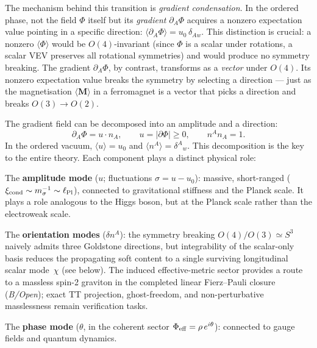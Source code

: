 \documentclass[11pt,a4paper]{article}
\begin{document}
The mechanism behind this transition is \emph{gradient condensation}. In the ordered phase, not the field $\Phi$ itself but its \emph{gradient} $\partial_A\Phi$ acquires a nonzero expectation value pointing in a specific direction: $\langle\partial_A\Phi\rangle = u_0\,\delta_{Aw}$. This distinction is crucial: a nonzero $\langle\Phi\rangle$ would be $O(4)$-invariant (since $\Phi$ is a scalar under rotations, a scalar VEV preserves all rotational symmetries) and would produce no symmetry breaking. The gradient $\partial_A\Phi$, by contrast, transforms as a \emph{vector} under $O(4)$. Its nonzero expectation value breaks the symmetry by selecting a direction --- just as the magnetisation $\langle\mathbf{M}\rangle$ in a ferromagnet is a vector that picks a direction and breaks $O(3) \to O(2)$.

The gradient field can be decomposed into an amplitude and a direction:
\begin{equation}
  \partial_A\Phi = u \cdot n_A,
  \qquad u = |\partial\Phi| \geq 0,
  \qquad n^A n_A = 1.
  \label{eq:pop_polar}
\end{equation}
In the ordered vacuum, $\langle u \rangle = u_0$ and $\langle n^A \rangle = \delta^A{}_w$. This decomposition is the key to the entire theory. Each component plays a distinct physical role:

The \textbf{amplitude mode} ($u$; fluctuations $\sigma = u - u_0$): massive, short-ranged ($\xi_{\rm cond} \sim m_\sigma^{-1} \sim \ell_{\rm Pl}$), connected to gravitational stiffness and the Planck scale. It plays a role analogous to the Higgs boson, but at the Planck scale rather than the electroweak scale.

The \textbf{orientation modes} ($\delta n^A$): the symmetry breaking $O(4)/O(3) \simeq S^3$ naively admits three Goldstone directions, but integrability of the scalar-only basis reduces the propagating soft content to a single surviving longitudinal scalar mode~$\chi$ (see below). The induced effective-metric sector provides a route to a massless spin-2 graviton in the completed linear Fierz--Pauli closure (\emph{B/Open}); exact TT projection, ghost-freedom, and non-perturbative masslessness remain verification tasks.

The \textbf{phase mode} ($\theta$, in the coherent sector $\Phi_{\rm eff} = \rho\,e^{i\theta}$): connected to gauge fields and quantum dynamics.
\end{document}
